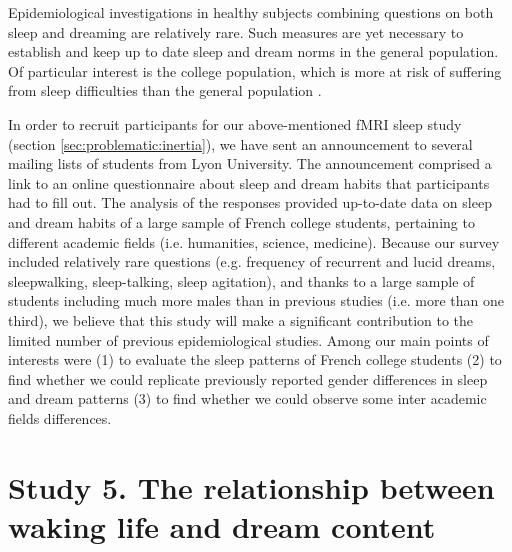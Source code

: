 Epidemiological investigations in healthy subjects combining questions on both sleep and dreaming are relatively rare. Such measures are yet necessary to establish and keep up to date sleep and dream norms in the general population. Of particular interest is the college population, which is more at risk of suffering from sleep difficulties than the general population \citep{buboltz_sleep_2001, curcio_sleep_2006, forquer_sleep_2008, lund_sleep_2010}.

In order to recruit participants for our above-mentioned fMRI sleep study (section \ref{sec:problematic:inertia}), we have sent an announcement to several mailing lists of students from Lyon University. The announcement comprised a link to an online questionnaire about sleep and dream habits that participants had to fill out. The analysis of the responses provided up-to-date data on sleep and dream habits of a large sample of French college students, pertaining to different academic fields (i.e. humanities, science, medicine). Because our survey included relatively rare questions (e.g. frequency of recurrent and lucid dreams, sleepwalking, sleep-talking, sleep agitation), and thanks to a large sample of students including much more males than in previous studies (i.e. more than one third), we believe that this study will make a significant contribution to the limited number of previous epidemiological studies. Among our main points of interests were (1) to evaluate the sleep patterns of French college students (2) to find whether we could replicate previously reported gender differences in sleep and dream patterns (3) to find whether we could observe some inter academic fields differences.

\section{Study 5. The relationship between waking life and dream content}
\label{sec:problematic:wle}

